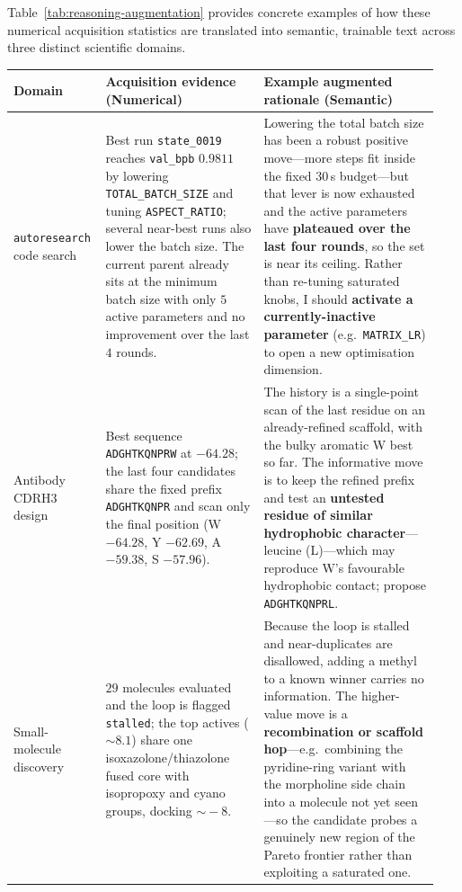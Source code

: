 Table~\ref{tab:reasoning-augmentation} provides concrete examples of how these numerical acquisition statistics are translated into semantic, trainable text across three distinct scientific domains.

\begin{table}[t]
\centering
\small
\begin{tabular}{@{}p{0.18\linewidth}p{0.36\linewidth}p{0.40\linewidth}@{}}
\toprule
\textbf{Domain} & \textbf{Acquisition evidence (Numerical)} & \textbf{Example augmented rationale (Semantic)} \\
\midrule
\texttt{autoresearch} code search &
Best run \texttt{state\_0019} reaches \texttt{val\_bpb} $0.9811$ by lowering \texttt{TOTAL\_BATCH\_SIZE} and tuning \texttt{ASPECT\_RATIO}; several near-best runs also lower the batch size. The current parent already sits at the minimum batch size with only $5$ active parameters and no improvement over the last $4$ rounds. &
Lowering the total batch size has been a robust positive move---more steps fit inside the fixed $30$\,s budget---but that lever is now exhausted and the active parameters have \textbf{plateaued over the last four rounds}, so the set is near its ceiling. Rather than re-tuning saturated knobs, I should \textbf{activate a currently-inactive parameter} (e.g.\ \texttt{MATRIX\_LR}) to open a new optimisation dimension. \\
\addlinespace
Antibody CDRH3 design &
Best sequence \texttt{ADGHTKQNPRW} at $-64.28$; the last four candidates share the fixed prefix \texttt{ADGHTKQNPR} and scan only the final position (W $-64.28$, Y $-62.69$, A $-59.38$, S $-57.96$). &
The history is a single-point scan of the last residue on an already-refined scaffold, with the bulky aromatic W best so far. The informative move is to keep the refined prefix and test an \textbf{untested residue of similar hydrophobic character}---leucine (L)---which may reproduce W's favourable hydrophobic contact; propose \texttt{ADGHTKQNPRL}. \\
\addlinespace
Small-molecule discovery &
$29$ molecules evaluated and the loop is flagged \texttt{stalled}; the top actives ($\sim\!8.1$) share one isoxazolone/thiazolone fused core with isopropoxy and cyano groups, docking $\sim\!-8$. &
Because the loop is stalled and near-duplicates are disallowed, adding a methyl to a known winner carries no information. The higher-value move is a \textbf{recombination or scaffold hop}---e.g.\ combining the pyridine-ring variant with the morpholine side chain into a molecule not yet seen---so the candidate probes a genuinely new region of the Pareto frontier rather than exploiting a saturated one. \\

\end{tabular}
\end{table}
